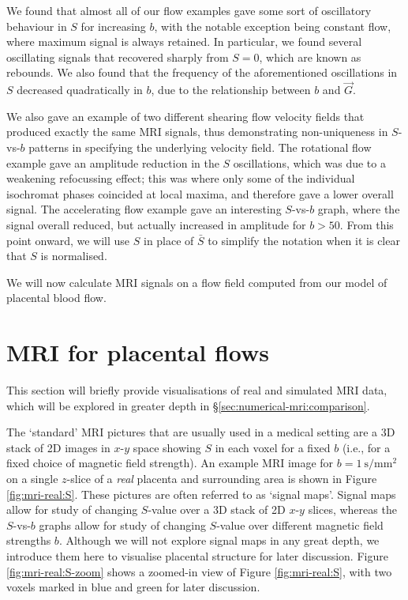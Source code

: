             We found that almost all of our flow examples gave some sort of oscillatory behaviour in $S$ for increasing $b$, with the notable exception being constant flow, where maximum signal is always retained. In particular, we found several oscillating signals that recovered sharply from $S=0$, which are known as rebounds. We also found that the frequency of the aforementioned oscillations in $S$ decreased quadratically in $b$, due to the relationship between $b$ and $\vec{G}$.

            We also gave an example of two different shearing flow velocity fields that produced exactly the same MRI signals, thus demonstrating non-uniqueness in $S$-vs-$b$ patterns in specifying the underlying velocity field. The rotational flow example gave an amplitude reduction in the $S$ oscillations, which was due to a weakening refocussing effect; this was where only some of the individual isochromat phases coincided at local maxima, and therefore gave a lower overall signal. The accelerating flow example gave an interesting $S$-vs-$b$ graph, where the signal overall reduced, but actually increased in amplitude for $b > 50$. From this point onward, we will use $S$ in place of $\bar{S}$ to simplify the notation when it is clear that $S$ is normalised.

            We will now calculate MRI signals on a flow field computed from our model of placental blood flow.

    \section{MRI for placental flows} \label{sec:numerical-mri:placental}
        This section will briefly provide visualisations of real and simulated MRI data, which will be explored in greater depth in \S\ref{sec:numerical-mri:comparison}.
    
        The `standard' MRI pictures that are usually used in a medical setting are a 3D stack of 2D images in $x$-$y$ space showing $S$ in each voxel for a fixed $b$ (i.e., for a fixed choice of magnetic field strength). An example MRI image for $b=\qty{1}{\second\per\milli\metre^2}$ on a single $z$-slice of a \textit{real} placenta and surrounding area is shown in Figure \ref{fig:mri-real:S}. These pictures are often referred to as `signal maps'. Signal maps allow for study of changing $S$-value over a 3D stack of 2D $x$-$y$ slices, whereas the $S$-vs-$b$ graphs allow for study of changing $S$-value over different magnetic field strengths $b$. Although we will not explore signal maps in any great depth, we introduce them here to visualise placental structure for later discussion. Figure \ref{fig:mri-real:S-zoom} shows a zoomed-in view of Figure \ref{fig:mri-real:S}, with two voxels marked in blue and green for later discussion. 

